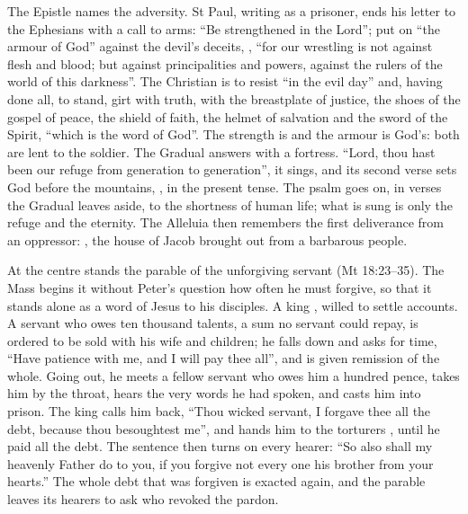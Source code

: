 The Epistle names the adversity. St Paul, writing as a prisoner, ends his
letter to the Ephesians with a call to arms: ``Be strengthened in the Lord'';
put on ``the armour of God'' against the devil's deceits, , ``for
our wrestling is not against flesh and blood; but against principalities and
powers, against the rulers of the world of this darkness''. The Christian is to
resist ``in the evil day'' and, having done all, to stand, girt with truth, with
the breastplate of justice, the shoes of the gospel of peace, the shield of
faith, the helmet of salvation and the sword of the Spirit, ``which is the word
of God''. The strength is  and the armour is God's: both are
lent to the soldier. The Gradual answers with a fortress. ``Lord, thou hast
been our refuge from generation to generation'', it sings, and its second verse
sets God before the mountains, , in the present tense. The psalm goes on, in verses the Gradual leaves
aside, to the shortness of human life; what is sung is only the refuge and the
eternity. The Alleluia then remembers the first deliverance from an oppressor:
, the house of Jacob brought out from a
barbarous people.

At the centre stands the parable of the unforgiving servant (Mt 18:23--35). The
Mass begins it without Peter's question how often he must forgive, so that it
stands alone as a word of Jesus to his disciples. A king , willed to settle accounts. A servant who owes ten thousand talents, a
sum no servant could repay, is ordered to be sold with his wife and children; he
falls down and asks for time, ``Have patience with me, and I will pay thee
all'', and is given remission of the whole. Going out, he meets a fellow servant
who owes him a hundred pence, takes him by the throat, hears the very words he
had spoken, and casts him into prison. The king calls him back, ``Thou wicked
servant, I forgave thee all the debt, because thou besoughtest me'', and hands
him to the torturers , until he
paid all the debt. The sentence then turns on every hearer: ``So also shall my
heavenly Father do to you, if you forgive not every one his brother from your
hearts.'' The whole debt that was forgiven is exacted again, and the parable
leaves its hearers to ask who revoked the pardon.

